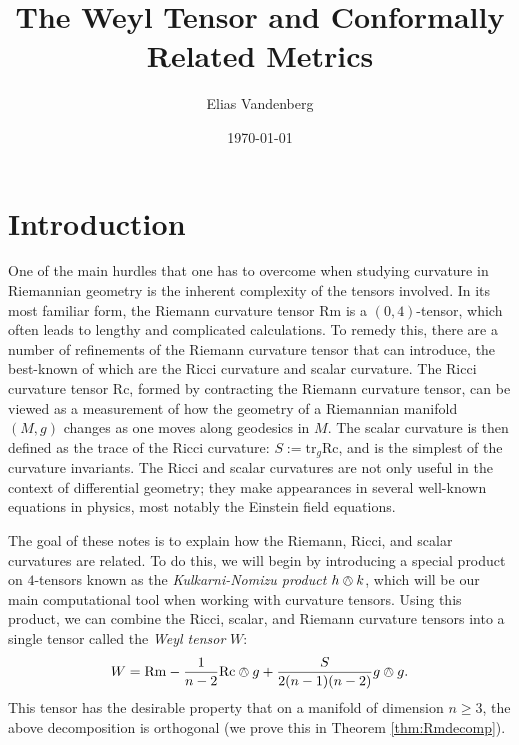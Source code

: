 \documentclass{amsart}
\numberwithin{equation}{section}
\newcommand{\tr}{\mathrm{tr}}
\newcommand{\Rc}{\mathrm{Rc}}
\newcommand{\Rm}{\mathrm{Rm}}
\theoremstyle{plain}
\theoremstyle{definition}
\theoremstyle{remark}
\begin{document}
\title{The Weyl Tensor and Conformally Related Metrics}

\author{Elias Vandenberg}
\address{Department of Mathematics, Western University}
\date{\today}

\maketitle
\tableofcontents

\section*{Introduction}
One of the main hurdles that one has to overcome when studying curvature in Riemannian geometry is the inherent complexity of the tensors involved. In its most familiar form, the Riemann curvature tensor $\Rm$ is a $(0,4)$-tensor, which often leads to lengthy and complicated calculations. To remedy this, there are a number of refinements of the Riemann curvature tensor that can introduce, the best-known of which are the Ricci curvature and scalar curvature. The Ricci curvature tensor $\Rc$, formed by contracting the Riemann curvature tensor, can be viewed as a measurement of how the geometry of a Riemannian manifold $(M,g)$ changes as one moves along geodesics in $M$. The scalar curvature is then defined as the trace of the Ricci curvature: $S := \tr_g{\Rc}$, and is the simplest of the curvature invariants. The Ricci and scalar curvatures are not only useful in the context of differential geometry; they make appearances in several well-known equations in physics, most notably the Einstein field equations.

The goal of these notes is to explain how the Riemann, Ricci, and scalar curvatures are related. To do this, we will begin by introducing a special product on $4$-tensors known as the \emph{Kulkarni-Nomizu product} $h\owedge k$, which will be our main computational tool when working with curvature tensors. Using this product, we can combine the Ricci, scalar, and Riemann curvature tensors into a single tensor called the \emph{Weyl tensor} $W$:
\[W = \Rm - \frac{1}{n-2}\Rc \owedge g + \frac{S}{2(n-1)(n-2)}g \owedge g.\]
This tensor has the desirable property that on a manifold of dimension $n \ge 3$, the above decomposition is orthogonal (we prove this in Theorem \ref{thm:Rmdecomp}).
\end{document}
